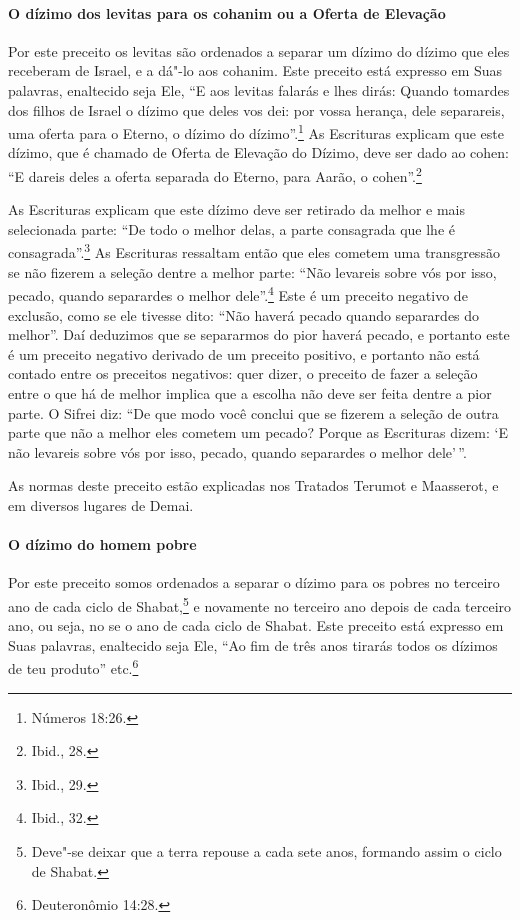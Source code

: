 \begin{multicols}{2}
\paragraph{O dízimo dos levitas\starr{} para os cohanim\starr{} ou a Oferta de Elevação}

Por este preceito os levitas\starr{} são ordenados a separar um dízimo do dízimo
que eles receberam de Israel, e a dá"-lo aos cohanim\starr. Este preceito
está expresso em Suas palavras, enaltecido seja Ele, ``E aos levitas\starr{}
falarás e lhes dirás: Quando tomardes dos filhos de Israel o dízimo que
deles vos dei: por vossa herança, dele separareis, uma oferta para o
Eterno, o dízimo do dízimo''.\footnote{Números 18:26.} As Escrituras explicam que
este dízimo, que é chamado de Oferta de Elevação do Dízimo, deve ser
dado ao cohen\starr{}: ``E dareis deles a oferta separada do Eterno, para
Aarão, o cohen\starr{}''.\footnote{Ibid., 28.}

As Escrituras explicam que este dízimo deve ser retirado da melhor e
mais selecionada parte: ``De todo o melhor delas, a parte consagrada que
lhe é consagrada''.\footnote{Ibid., 29.} As Escrituras ressaltam então que eles
cometem uma transgressão se não fizerem a seleção dentre a melhor parte:
``Não levareis sobre vós por isso, pecado, quando separardes o melhor
dele''.\footnote{Ibid., 32.} Este é um preceito negativo de exclusão, como se ele
tivesse dito: ``Não haverá pecado quando separardes do melhor''. Daí
deduzimos que se separarmos do pior haverá pecado, e portanto este é um
preceito negativo derivado de um preceito positivo, e portanto não está
contado entre os preceitos negativos: quer dizer, o preceito de fazer a
seleção entre o que há de melhor implica que a escolha não deve ser
feita dentre a pior parte. O Sifrei\starr{} diz: ``De que modo você conclui que
se fizerem a seleção de outra parte que não a melhor eles cometem um
pecado? Porque as Escrituras dizem: `E não levareis sobre vós por isso,
pecado, quando separardes o melhor dele'\,''.

As normas deste preceito estão explicadas nos Tratados Terumot\starr{} e
Maasserot\starr, e em diversos lugares de Demai\starr.

\paragraph{O dízimo do homem pobre}

Por este preceito somos ordenados a separar o dízimo para os pobres no
terceiro ano de cada ciclo de Shabat,\footnote{Deve"-se deixar que a terra repouse a cada sete anos, formando assim o
  ciclo de Shabat.} e novamente
no terceiro ano depois de cada terceiro ano, ou seja, no se o ano de
cada ciclo de Shabat. Este preceito está expresso em Suas palavras,
enaltecido seja Ele, ``Ao fim de três anos tirarás todos os dízimos de
teu produto'' etc.\footnote{Deuteronômio 14:28.}


\end{multicols}
